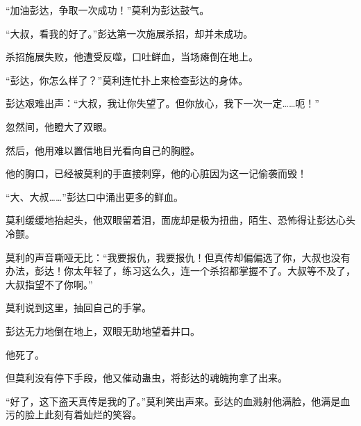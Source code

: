 \begin{this_body}
“加油彭达，争取一次成功！”莫利为彭达鼓气。

“大叔，看我的好了。”彭达第一次施展杀招，却并未成功。

杀招施展失败，他遭受反噬，口吐鲜血，当场瘫倒在地上。

“彭达，你怎么样了？”莫利连忙扑上来检查彭达的身体。

彭达艰难出声：“大叔，我让你失望了。但你放心，我下一次一定……呃！”

忽然间，他瞪大了双眼。

然后，他用难以置信地目光看向自己的胸膛。

他的胸口，已经被莫利的手直接刺穿，他的心脏因为这一记偷袭而毁！

“大、大叔……”彭达口中涌出更多的鲜血。

莫利缓缓地抬起头，他双眼留着泪，面庞却是极为扭曲，陌生、恐怖得让彭达心头冷颤。

莫利的声音嘶哑无比：“我要报仇，我要报仇！但真传却偏偏选了你，大叔也没有办法，彭达！你太年轻了，练习这么久，连一个杀招都掌握不了。大叔等不及了，大叔指望不了你啊。”

莫利说到这里，抽回自己的手掌。

彭达无力地倒在地上，双眼无助地望着井口。

他死了。

但莫利没有停下手段，他又催动蛊虫，将彭达的魂魄拘拿了出来。

“好了，这下盗天真传是我的了。”莫利笑出声来。彭达的血溅射他满脸，他满是血污的脸上此刻有着灿烂的笑容。

\end{this_body}

